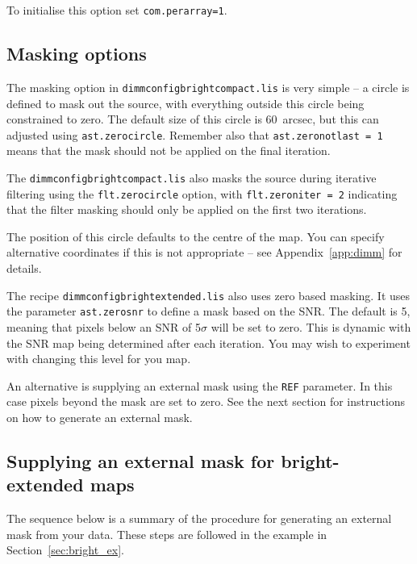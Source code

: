 \documentclass[twoside,11pt]{article}
\newcommand{\htmlref}[2]{#1}
\newcommand{\latexhtml}[2]{#1}
\newcommand{\xlabel}[1]{}
\renewcommand{\_}{\texttt{\symbol{95}}}
\newcommand{\cref}[3]{\latexhtml{#1~\ref{#2}}{\htmlref{#3}{#2}}}
\begin{document}
To initialise this option set \texttt{com.perarray=1}.


\subsection{\xlabel{mask}Masking options}
\label{sec:mask}

The masking option in \texttt{dimmconfig\_bright\_compact.lis} is very
simple -- a circle is defined to mask out the source, with everything
outside this circle being constrained to zero. The default size of
this circle is 60~arcsec, but this can adjusted using
\texttt{ast.zero\_circle}. Remember also that
\texttt{ast.zero\_notlast = 1} means that the mask should not be
applied on the final iteration.

The \texttt{dimmconfig\_bright\_compact.lis} also masks the source
during iterative filtering using the \texttt{flt.zero\_circle} option,
with \texttt{flt.zero\_niter = 2} indicating that the filter masking
should only be applied on the first two iterations.

The position of this circle defaults to the centre of the map. You can
specify alternative coordinates if this is not appropriate -- see
\cref{Appendix}{app:dimm}{dimmconfig.lis} for details.

The recipe \texttt{dimmconfig\_bright\_extended.lis} also uses zero
based masking. It uses the parameter \texttt{ast.zero\_snr} to define
a mask based on the SNR. The default is 5, meaning that pixels below an
SNR of 5$\sigma$ will be set to zero. This is dynamic with the SNR map
being determined after each iteration. You may wish to experiment with
changing this level for you map.

An alternative is supplying an external mask using the \texttt{REF}
parameter. In this case pixels beyond the mask are set to zero. See
the next section for instructions on how to generate an external mask.


\subsection{\xlabel{maskbe}Supplying an external mask for bright-extended maps}
\label{sec:maskbe}

The sequence below is a summary of the procedure for generating an
external mask from your data. These steps are followed in the example
\cref{in Section}{sec:bright_ex}{Extended galactic sources}.
\end{document}
